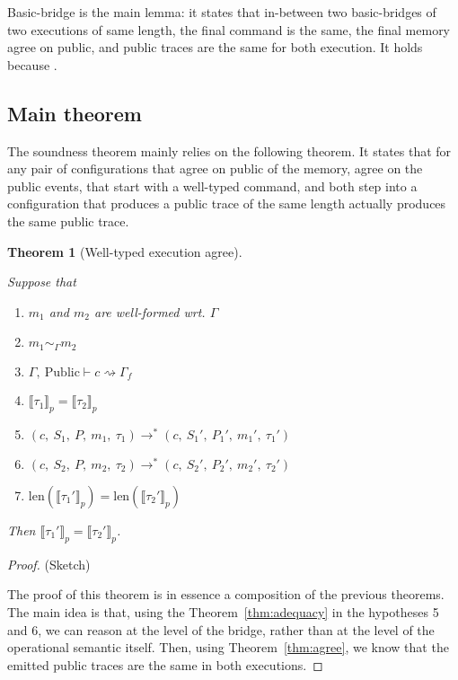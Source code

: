 \documentclass[10pt]{article}
\newcommand{\ctx}{\Gamma}
\newcommand{\typing}[4]{ #1,~#2 \vdash #3 \rightsquigarrow #4}
\newcommand{\exectrans}[2] { #1 \rightarrow^{*} #2 }
\newcommand{\pproj}[1]{\llbracket #1 \rrbracket_{p}}
\newcommand{\agree}[3]{#2 \sim_{#1} #3}
\newtheorem{theorem}{Theorem}
\begin{document}
Basic-bridge is the main lemma: it states that in-between two basic-bridges of two executions of
same length, the final command is the same, the final memory agree on public, and
public traces are the same for both execution.
It holds because .


\subsection{Main theorem}%
\label{subsec:main_theorem}

The soundness theorem mainly relies on the following theorem. It states that for
any pair of configurations that agree on public of the memory, agree on the public events,
that start with a well-typed command, and both step into a configuration that produces a
public trace of the same length actually produces the same public trace.

\begin{theorem}[Well-typed execution agree]\label{thm:sound}

Suppose that

\begin{enumerate}
  \item $m_{1}$ and $m_{2}$ are well-formed wrt. $\ctx$
  \item $\agree{\ctx}{m_{1}}{m_{2}}$
  \item \( \typing{\ctx}{\mathrm{Public}}{c}{\ctx_{f}}\)
  \item $\pproj{\tau_{1}} = \pproj{\tau_{2}}$
  \item \(
        \exectrans
        {(c,~S_{1},~P,~m_{1},~\tau_{1})}
        {(c,~S_{1}',~P_{1}',~m_{1}',~\tau_{1}')}
        \)
  \item \(
        \exectrans
        {(c,~S_{2},~P,~m_{2},~\tau_{2})}
        {(c,~S_{2}',~P_{2}',~m_{2}',~\tau_{2}')}
        \)
  \item $\mathrm{len}(\pproj{\tau_{1}'}) = \mathrm{len}(\pproj{\tau_{2}'})$
\end{enumerate}

Then $\pproj{\tau_{1}'} = \pproj{\tau_{2}'}$.
\end{theorem}


\begin{proof} (Sketch)

  The proof of this theorem is in essence a composition of the previous theorems. The main idea is
  that, using the Theorem~\ref{thm:adequacy} in the hypotheses 5 and 6,
  we can reason at the level of the bridge, rather than at the level of the operational semantic
  itself.
  Then, using Theorem~\ref{thm:agree}, we know that the emitted public traces are the same in both
  executions.

\end{proof}
\end{document}
